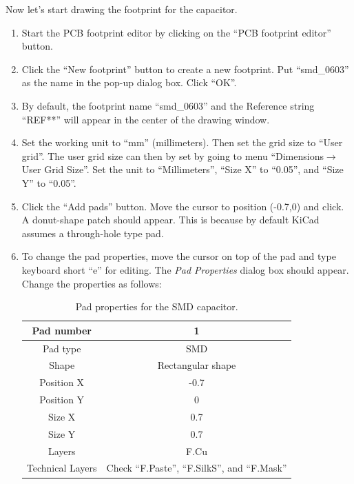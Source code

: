 \documentclass[12pt,letterpaper]{scrartcl}
\begin{document}
Now let's start drawing the footprint for the capacitor. 
\begin{enumerate}
	\item Start the PCB footprint editor by clicking on the ``PCB footprint editor'' button. 
	
	\item Click the ``New footprint'' button to create a new footprint. Put ``smd\_0603'' as the name in the pop-up dialog box. Click ``OK''. 
	
	\item By default, the footprint name ``smd\_0603'' and the Reference string ``REF**'' will appear in the center of the drawing window. 
	
	\item Set the working unit to ``mm'' (millimeters). Then set the grid size to ``User grid''. The user grid size can then by set by going to menu ``Dimensions$\rightarrow$User Grid Size''. Set the unit to ``Millimeters'', ``Size X'' to ``0.05'', and ``Size Y'' to ``0.05''.
	
	\item Click the ``Add pads'' button. Move the cursor to position (-0.7,0) and click. A donut-shape patch should appear. This is because by default KiCad assumes a through-hole type pad. 
	
	\item To change the pad properties, move the cursor on top of the pad and type keyboard short ``e'' for editing. The \emph{Pad Properties} dialog box should appear. Change the properties as follows:
		\begin{table}[h]
			\centering
			\caption{Pad properties for the SMD capacitor.}
			\renewcommand{\arraystretch}{1.2}
			\small
			\begin{tabular}{|c|c|}
				\hline  Pad number & 1 \\ 
				\hline  Pad type & SMD \\ 
				\hline  Shape & Rectangular shape \\ 
				\hline  Position X & -0.7 \\ 
				\hline  Position Y & 0  \\ 
				\hline  Size X & 0.7 \\ 
				\hline  Size Y & 0.7  \\ 
				\hline  Layers & F.Cu \\ 
				\hline  Technical Layers & Check ``F.Paste'', ``F.SilkS'', and ``F.Mask''  \\ 
				\hline 
			\end{tabular} 
		\end{table}
	

\end{enumerate}
\end{document}
